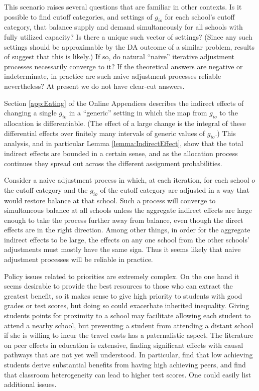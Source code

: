 \documentclass[12pt, A4paper]{article}
\theoremstyle{definition}
\begin{document}
This scenario raises several questions that are familiar in other contexts.  Is it possible to find cutoff categories, and settings of $g_{io}$ for each school's cutoff category, that balance supply and demand simultaneously for all schools with fully utilized capacity?  Is there a unique such vector of settings?  (Since any such settings should be approximable by the DA outcome of a similar problem, results of \cite{AzLe16} suggest that this is likely.) If so, do natural ``naive'' iterative adjustment processes necessarily converge to it?  If the theoretical answers are negative or indeterminate, in practice 
are such naive adjustment processes reliable nevertheless?  At present we do not have clear-cut answers.

Section \ref{app:Eating} of the Online Appendices describes the indirect effects of changing a single $g_{io}$ in a ``generic'' setting in which the map from $g_{io}$ to the allocation is differentiable.  (The effect of a large change is the integral of these differential effects over finitely many intervals of generic values of $g_{io}$.)  This analysis, and in particular Lemma \ref{lemma:IndirectEffect}, show that the total indirect effects are bounded in a certain sense, and as the allocation process continues they spread out across the different assignment probabilities.  

Consider a naive adjustment process in which, at each iteration, for each school $o$ the cutoff category and the $g_{io}$ of the cutoff category are adjusted in a way that would restore balance at that school.  Such a process will converge to simultaneous balance at all schools unless the aggregate indirect effects are large enough to take the process further away from balance, even though the direct effects are in the right direction.  Among other things, in order for the aggregate indirect effects to be large, the effects on any one school from the other schools' adjustments must mostly have the same sign.  Thus it seems likely that naive adjustment processes will be reliable in practice.  

Policy issues related to priorities are extremely complex.  On the one hand it seems desirable to provide the best resources to those who can extract the greatest benefit, so it makes sense to give high priority to students with good grades or test scores, but doing so could exacerbate inherited inequality.  Giving students points for proximity to a school may facilitate allowing each student to attend a nearby school, but preventing a student from attending a distant school if she is willing to incur the travel costs has a paternalistic aspect. The literature on peer effects in education \citep{EpRo11,Sac11} is extensive, finding significant effects with causal pathways that are not yet well understood.  In particular, \cite{BuSa13} find that low achieving students derive substantial benefits from having high achieving peers, and \cite{ViNe07} find that classroom heterogeneity can lead to higher test scores. 
One could easily list additional issues.  
\end{document}

